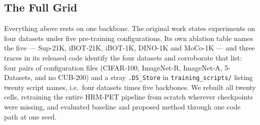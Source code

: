 \documentclass[runningheads]{llncs}
\begin{document}
\subsection{The Full Grid}
\label{sec:grid}

Everything above rests on one backbone. The original work states experiments on
four datasets under five pre-training configurations. Its own ablation table
names the five --- Sup-21K, iBOT-21K, iBOT-1K, DINO-1K and MoCo-1K --- and three
traces in its released code identify the four datasets and corroborate that
list: four pairs of configuration files (CIFAR-100, ImageNet-R, ImageNet-A,
5-Datasets, and no CUB-200) and a stray \texttt{.DS\_Store} in
\texttt{training\_scripts/} listing twenty script names, i.e.\ four datasets
times five backbones. We rebuilt all twenty cells, retraining the entire HRM-PET
pipeline from scratch wherever checkpoints were missing, and evaluated baseline
and proposed method through one code path at one seed.
\end{document}
